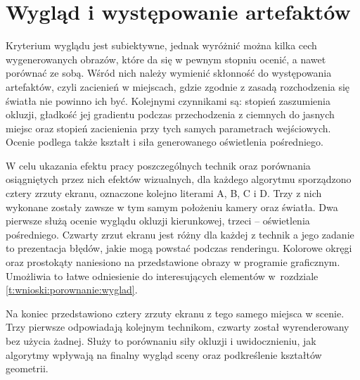 	\pagebreak
	
	\section{Wygląd i występowanie artefaktów}
	\label{t:wyniki:artefakty}
	
	\raggedbottom
	Kryterium wyglądu jest subiektywne, jednak wyróżnić można kilka cech wygenerowanych obrazów, które da się w pewnym stopniu ocenić, a nawet porównać ze sobą. Wśród nich należy wymienić skłonność do występowania artefaktów, czyli zacienień w miejscach, gdzie zgodnie z zasadą rozchodzenia się światła nie powinno ich być. Kolejnymi czynnikami są: stopień zaszumienia okluzji, gładkość jej gradientu podczas przechodzenia z ciemnych do jasnych miejsc oraz stopień zacienienia przy tych samych parametrach wejściowych. Ocenie podlega także kształt i siła generowanego oświetlenia pośredniego.
	
	W celu ukazania efektu pracy poszczególnych technik oraz porównania osiągniętych przez nich efektów wizualnych, dla każdego algorytmu sporządzono cztery zrzuty ekranu, oznaczone kolejno literami A, B, C i D. Trzy z nich wykonane zostały zawsze w tym samym położeniu kamery oraz światła. Dwa pierwsze służą ocenie wyglądu okluzji kierunkowej, trzeci -- oświetlenia pośredniego. Czwarty zrzut ekranu jest różny dla każdej z technik a jego zadanie to prezentacja błędów, jakie mogą powstać podczas renderingu. Kolorowe okręgi oraz prostokąty naniesiono na przedstawione obrazy w programie graficznym. Umożliwia to łatwe odniesienie do interesujących elementów w~rozdziale \ref{t:wnioski:porownanie:wyglad}.
	
	Na koniec przedstawiono cztery zrzuty ekranu z tego samego miejsca w scenie. Trzy pierwsze odpowiadają kolejnym technikom, czwarty został wyrenderowany bez użycia żadnej. Służy to porównaniu siły okluzji i uwidocznieniu, jak algorytmy wpływają na finalny wygląd sceny oraz podkreślenie kształtów geometrii.

	\pagebreak	\flushbottom
	
	
	\pagebreak
	
	
	\pagebreak
	
	
	\pagebreak
	
	
	\pagebreak